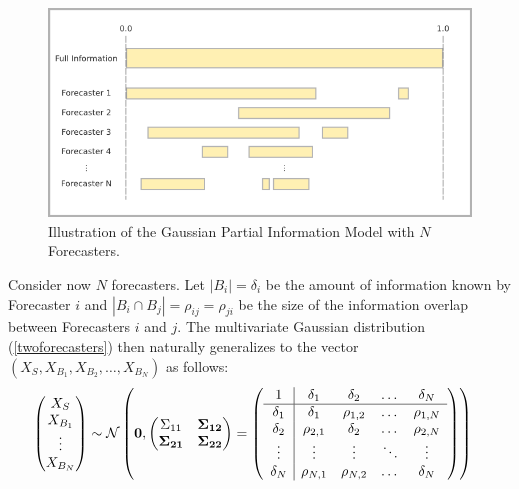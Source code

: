 \documentclass[12pt]{article}
\theoremstyle{definition}
\theoremstyle{definition}
\begin{document}
\begin{figure}[t]
   \includegraphics[width = \textwidth]{N=N} %
   \caption{Illustration of the Gaussian Partial Information Model with $N$ Forecasters.}
   \label{diagramN}
\end{figure}

Consider now $N$ forecasters. Let $|B_i| = \delta_i$ be the amount of
information known by Forecaster $i$ and $|B_i
\cap B_j| = \rho_{ij} = \rho_{ji}$ be the size of the information overlap between
Forecasters $i$ and $j$. The multivariate Gaussian distribution (\ref{twoforecasters}) then naturally generalizes to the vector
$\left(X_{S}, X_{B_1}, X_{B_2}, \dots, X_{B_N}\right)$ as follows:
\begin{align}
\left(\begin{matrix} X_S \\ X_{B_1}\\ \vdots \\ X_{B_N} \end{matrix}\right) &\sim \mathcal{N}\left( 
 \boldsymbol{0}, \left(\begin{matrix} 
\Sigma_{11} & {\bf \Sigma_{12}}\\
{\bf\Sigma_{21}} & {\bf \Sigma_{22}}\\
 \end{matrix}\right) 
 =
 \left(\begin{array}{c | c c cc }
1 & \delta_1 & \delta_2 & \dots & \delta_N  \\ \hline
\delta_1 & \delta_1 &\rho_{1,2} & \dots & \rho_{1,N}   \\ 
\delta_2 & \rho_{2,1} & \delta_2 & \dots & \rho_{2,N}  \\ 
\vdots & \vdots & \vdots & \ddots & \vdots  \\ 
\delta_N & \rho_{N,1} & \rho_{N,2} & \dots & \delta_N\\ 
 \end{array}\right)\right)  \label{Nforecasters}
\end{align}
\end{document}
